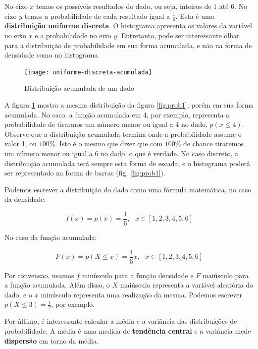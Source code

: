 No eixo $x$ temos os possíveis resultados do dado, ou seja, inteiros de 1 até 6. No eixo $y$ temos a probabilidade de cada resultado igual a $\frac{1}{6}$. Esta é uma \textbf{distribuição uniforme discreta}. O histograma apresenta os valores da variável no eixo $x$ e a probabilidade no eixo $y$. Entretanto, pode ser interessante olhar para a distribuição de probabilidade em sua forma acumulada, e não na forma de densidade como no histograma. 

\begin{figure}[H]
\begin{centering}
\texttt{[image: uniforme-discreta-acumulada]}\protect\caption{\label{fig:prob2}Distribuição acumulada de um dado}
\end{centering}
\end{figure}

A figura \ref{fig:prob2} mostra a mesma distribuição da figura \ref{fig:prob1}, porém em sua forma acumulada. No caso, a função acumulada em 4, por exemplo, representa a probabilidade de tirarmos um número menor ou igual a 4 no dado, $p(x\leq4)$. Observe que a distribuição acumulada termina onde a probabilidade assume o valor 1, ou $100\%$. Isto é o mesmo que dizer que com $100\%$ de chance tiraremos um número menor ou igual a 6 no dado, o que é verdade. No caso discreto, a distribuição acumulada terá sempre esta forma de escada, e o histograma poderá ser representado na forma de barras (fig. \ref{fig:prob1}).


Podemos escrever a distribuição do dado como uma fórmula matemática, no caso da densidade:

\begin{equation}
f(x)=p(x)=\frac{1}{6},~~~x\in [1,2,3,4,5,6]
\end{equation}

No caso da função acumulada:

\begin{equation}
F(x)=p(X\leq x)=\frac{1}{6}x,~~~x\in [1,2,3,4,5,6]
\end{equation}

Por convensão, usamos $f$ minúsculo para a função densidade e $F$ maiúsculo para a função acumulada. Além disso, o $X$ maiúsculo representa a variável aleatória do dado, e o $x$ minúsculo representa uma realização da mesma. Podemos escrever $p(X\leq 3)=\frac{1}{2}$, por exemplo. 

Por último, é interessante calcular a média e a variância das distribuições de probabilidade. A média é uma medida de \textbf{tendência central} e a variância mede \textbf{dispersão} em torno da média. 

